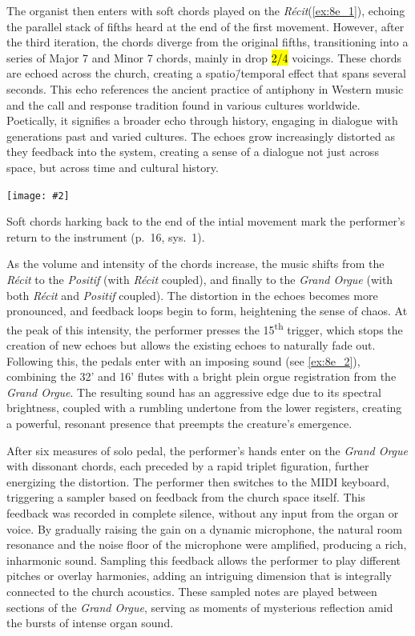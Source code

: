 \documentclass[12pt,twoside,maitrise]{dms_ks}
\newcommand{\customincludeexamples}[4][]{%
    \begin{example}[H]
        \centering
        \texttt{[image: \#2]}
        \caption{#4}
	\label{#3} 
    \end{example}
}
\theoremstyle{definition}
\begin{document}
{{The organist then enters with soft chords played on the \textit{Récit}(\cref{ex:8e_1}), echoing the parallel stack of fifths heard at the end of the first movement. 
However, after the third iteration, the chords diverge from the original fifths, transitioning into a series of Major 7 and Minor 7 chords, mainly in drop \hl{2/4} voicings. 
These chords are echoed across the church, creating a spatio\=/temporal effect that spans several seconds. 
This echo references the ancient practice of antiphony in Western music and the call and response tradition found in various cultures worldwide. 
Poetically, it signifies a broader echo through history, engaging in dialogue with generations past and varied cultures. 
The echoes grow increasingly distorted as they feedback into the system, creating a sense of a dialogue not just across space, but across time and cultural history.

\customincludeexamples[width=\textwidth]{8e_1}{ex:8e_1}{Soft chords harking back to the end of the intial movement mark the performer's return to the instrument (p.~16, sys.~1).}

As the volume and intensity of the chords increase, the music shifts from the \textit{Récit} to the \textit{Positif} (with \textit{Récit} coupled), and finally to the \textit{Grand Orgue} (with both \textit{Récit} and \textit{Positif} coupled). 
The distortion in the echoes becomes more pronounced, and feedback loops begin to form, heightening the sense of chaos. 
At the peak of this intensity, the performer presses the 15\textsuperscript{th} trigger, which stops the creation of new echoes but allows the existing echoes to naturally fade out. 
Following this, the pedals enter with an imposing sound (see \cref{ex:8e_2}), combining the 32' and 16' flutes with a bright plein orgue registration from the \textit{Grand Orgue}. 
The resulting sound has an aggressive edge due to its spectral brightness, coupled with a rumbling undertone from the lower registers, creating a powerful, resonant presence that preempts the creature’s emergence.

After six measures of solo pedal, the performer’s hands enter on the \textit{Grand Orgue} with dissonant chords, each preceded by a rapid triplet figuration, further energizing the distortion. 
The performer then switches to the MIDI keyboard, triggering a sampler based on feedback from the church space itself. 
This feedback was recorded in complete silence, without any input from the organ or voice. 
By gradually raising the gain on a dynamic microphone, the natural room resonance and the noise floor of the microphone were amplified, producing a rich, inharmonic sound. 
Sampling this feedback allows the performer to play different pitches or overlay harmonies, adding an intriguing dimension that is integrally connected to the church acoustics. 
These sampled notes are played between sections of the \textit{Grand Orgue}, serving as moments of mysterious reflection amid the bursts of intense organ sound.

}}
\end{document}

